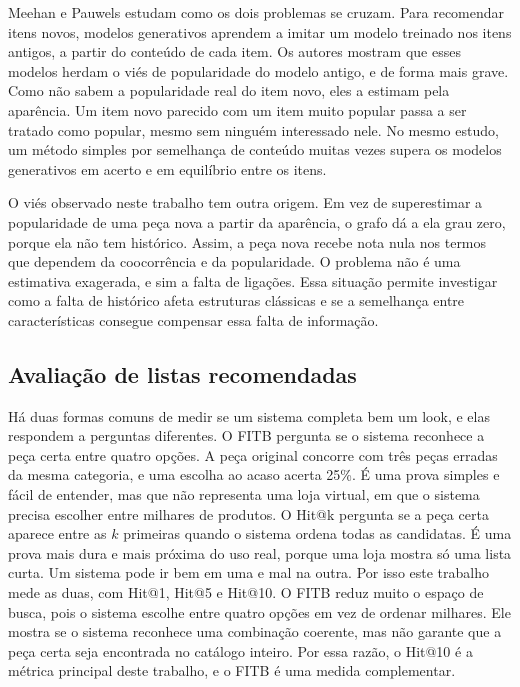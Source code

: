 \documentclass[conference]{IEEEtran}
\begin{document}
Meehan e Pauwels \cite{meehan2025} estudam como os dois problemas se cruzam. Para recomendar itens novos, modelos generativos aprendem a imitar um modelo treinado nos itens antigos, a partir do conteúdo de cada item. Os autores mostram que esses modelos herdam o viés de popularidade do modelo antigo, e de forma mais grave. Como não sabem a popularidade real do item novo, eles a estimam pela aparência. Um item novo parecido com um item muito popular passa a ser tratado como popular, mesmo sem ninguém interessado nele. No mesmo estudo, um método simples por semelhança de conteúdo muitas vezes supera os modelos generativos em acerto e em equilíbrio entre os itens.

O viés observado neste trabalho tem outra origem. Em vez de superestimar a popularidade de uma peça nova a partir da aparência, o grafo dá a ela grau zero, porque ela não tem histórico. Assim, a peça nova recebe nota nula nos termos que dependem da coocorrência e da popularidade. O problema não é uma estimativa exagerada, e sim a falta de ligações. Essa situação permite investigar como a falta de histórico afeta estruturas clássicas e se a semelhança entre características consegue compensar essa falta de informação.

\subsection{Avaliação de listas recomendadas}

Há duas formas comuns de medir se um sistema completa bem um look, e elas respondem a perguntas diferentes. O FITB \cite{han2017} pergunta se o sistema reconhece a peça certa entre quatro opções. A peça original concorre com três peças erradas da mesma categoria, e uma escolha ao acaso acerta 25\%. É uma prova simples e fácil de entender, mas que não representa uma loja virtual, em que o sistema precisa escolher entre milhares de produtos. O Hit@k \cite{deshpande2004} pergunta se a peça certa aparece entre as $k$ primeiras quando o sistema ordena todas as candidatas. É uma prova mais dura e mais próxima do uso real, porque uma loja mostra só uma lista curta. Um sistema pode ir bem em uma e mal na outra. Por isso este trabalho mede as duas, com Hit@1, Hit@5 e Hit@10. O FITB reduz muito o espaço de busca, pois o sistema escolhe entre quatro opções em vez de ordenar milhares. Ele mostra se o sistema reconhece uma combinação coerente, mas não garante que a peça certa seja encontrada no catálogo inteiro. Por essa razão, o Hit@10 é a métrica principal deste trabalho, e o FITB é uma medida complementar.
\end{document}
